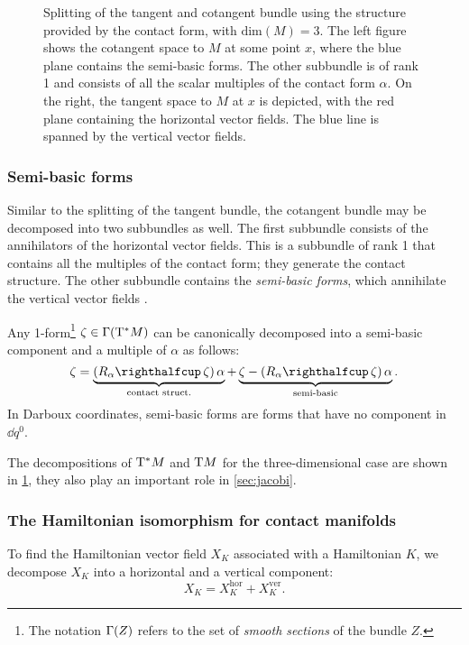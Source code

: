 \begin{figure}[ht!]
    \centering
    
    \caption{Splitting of the tangent and cotangent bundle using the structure provided by the contact form, with \(\text{dim}(M) = 3\). The left figure shows the cotangent space to \(M\) at some point \(x\), where the blue plane contains the semi-basic forms. The other subbundle is of rank 1 and consists of all the scalar multiples of the contact form \(\alpha\). On the right, the tangent space to \(M\) at \(x\) is depicted, with the red plane containing the horizontal vector fields. The blue line is spanned by the vertical vector fields.}
    \label{fig:contact_spaces}
\end{figure}

\subsubsection{Semi-basic forms} 
Similar to the splitting of the tangent bundle, the cotangent bundle may be decomposed into two subbundles as well. The first subbundle consists of the annihilators of the horizontal vector fields. This is a subbundle of rank 1 that contains all the multiples of the contact form; they generate the contact structure. The other subbundle contains the \emph{semi-basic forms}, which annihilate the vertical vector fields \cite{Libermann1987}.

Any 1-form\footnote{The notation $\mathrm{\Gamma}\qty(Z)$ refers to the set of \emph{smooth sections} of the bundle $Z$.} \(\zeta \in \mathrm{\Gamma}\qty(\mathrm{T}^*M)\) can be canonically decomposed into a semi-basic component and a multiple of \(\alpha\) as follows:
\begin{equation}
    \zeta = \underbrace{(\intpr{R_\alpha}{\zeta})\,\alpha}_\text{contact struct.} + \underbrace{\zeta - (\intpr{R_\alpha}{\zeta})\,\alpha}_\text{semi-basic}. 
    \label{eq:form_splitting}
\end{equation}
In Darboux coordinates, semi-basic forms are forms that have no component in \(\dd{q^0}\).

The decompositions of \(\mathrm{T}^*M\) and \(\mathrm{T}M\) for the three-dimensional case are shown in \cref{fig:contact_spaces}, they also play an important role in \cref{sec:jacobi}.

\subsubsection{The Hamiltonian isomorphism for contact manifolds}
To find the Hamiltonian vector field \(X_K\) associated with a Hamiltonian \(K\), we decompose \(X_K\) into a horizontal and a vertical component:
\begin{equation}
     X_K = X_K^\text{hor} + X_K^\text{ver}.
\end{equation}

